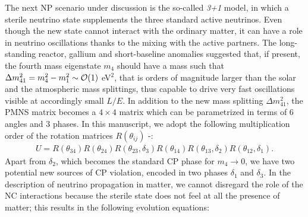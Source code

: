 \documentclass[12pt]{article}
\begin{document}
The next NP scenario under discussion is the so-called {\it 3+1} model, in which a sterile neutrino state supplements the three standard active neutrinos.
Even though the new state cannot interact with the ordinary matter, it can have a role in neutrino oscillations thanks to the mixing with the active partners. The long-standing reactor, gallium and short-baseline anomalies \cite{Boser:2019rta} suggested that, if present, the fourth mass eigenstate $m_4$ should have a mass such that $\Delta m_{41}^2 = m_4^2 - m_1^2\sim {\cal O}(1)$ eV$^2$, that is orders of magnitude larger than the solar and the atmospheric mass splittings, thus capable to drive very fast oscillations visible at accordingly small $L/E$. In addition to the new mass splitting $\Delta m_{41}^2$, the PMNS matrix becomes a $4\times 4$ matrix which can be parametrized in terms of 6 angles and 3 phases. In this manuscript, we adopt the following multiplication order of the rotation matrices $R(\theta_{ij})$ \cite{Maltoni:2007zf}-\cite{Meloni:2010zr}:
\begin{eqnarray}
 U=R(\theta_{34})R(\theta_{24})R(\theta_{23},\delta_3)R(\theta_{14})R(\theta_{13},\delta_2)R(\theta_{12},\delta_1).
 \label{parameterization}
\end{eqnarray}
Apart from $\delta_2$, which becomes the standard CP phase for $m_4 \to 0$, we have two potential new sources of CP violation, encoded in two phases $\delta_1$ and $\delta_3$.
In the description of neutrino propagation in matter, we cannot disregard the role of the NC interactions because the sterile state does not feel at all the presence of matter; this results in the following evolution equations:
\end{document}
